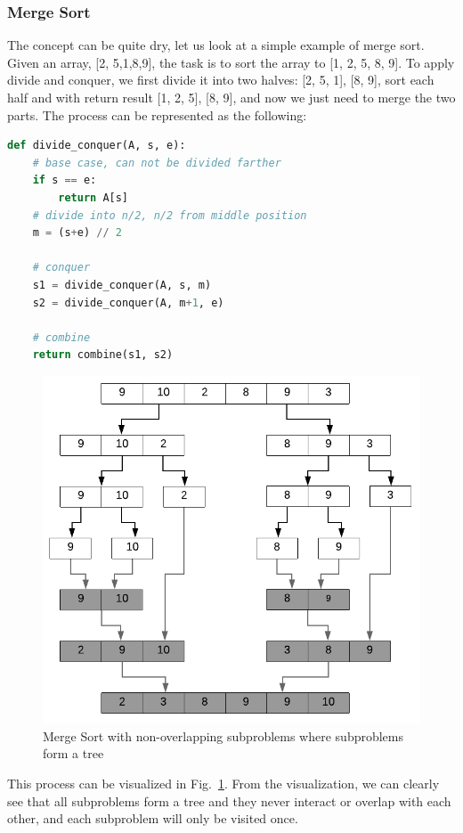 \documentclass[../main.tex]{subfiles}
\begin{document}
\subsubsection{Merge Sort}
The concept can be quite  dry, let us look at a simple example of merge sort. Given an array, [2, 5,1,8,9], the task is to sort the array to [1, 2, 5, 8, 9]. To apply divide and conquer, we first divide it into two halves: [2, 5, 1], [8, 9], sort each half and with return result [1, 2, 5], [8, 9], and now we just need to merge the two parts. The process can be represented as the following:
\begin{lstlisting}[language=Python]
def divide_conquer(A, s, e):
    # base case, can not be divided farther
    if s == e:
        return A[s]
    # divide into n/2, n/2 from middle position
    m = (s+e) // 2

    # conquer 
    s1 = divide_conquer(A, s, m)
    s2 = divide_conquer(A, m+1, e)
    
    # combine
    return combine(s1, s2)
\end{lstlisting}
\begin{figure}[h!]
    \centering

    \includegraphics[width=0.9\columnwidth]{fig/merge_sort.png}
    \caption{Merge Sort with non-overlapping subproblems where subproblems form a tree}
    \label{fig:merge_sort_tree}
\end{figure}
This process can be visualized in Fig.~\ref{fig:merge_sort_tree}. From the visualization, we can clearly see that all subproblems form a tree and they never interact or overlap with each other, and each subproblem will only be visited once.
\end{document}
